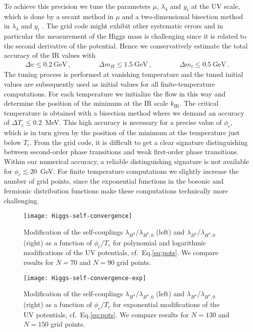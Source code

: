\documentclass[aps,prd,11pt,tightenlines,superscriptaddress,nofootinbib,preprintnumbers,notitlepage]{revtex4-1}
\newcommand{\qqquad}{\qquad \qquad}
\newcommand{\gev}{\text{GeV}}
\begin{document}
To achieve this precision we tune the parameters $\mu$,
$\lambda_4$ and $y_t$ at the UV scale, which is done by a secant
method in $\mu$ and a two-dimensional bisection method in $\lambda_4$
and $y_t$ .  The grid code might exhibit other systematic errors and
in particular the measurement of the Higgs mass is challenging since
it is related to the second derivative of the potential.  Hence we
conservatively estimate the total accuracy of the IR values with
%
\begin{align}
 \Delta v \leq 0.2 \ \gev\,, \qqquad \Delta m_H \leq 1.5 \ \gev\,,  \qqquad \Delta m_t \leq 0.5 \ \gev \,.
\end{align}
%
The tuning process is performed at vanishing temperature and the
tuned initial values are subsequently used as initial values for
all finite-temperature computations.  For each temperature we
initialize the flow in this way and determine the position of the
minimum at the IR scale $k_\text{IR}$.  The critical temperature is
obtained with a bisection method where we demand an accuracy of
$\Delta T_c \leq 0.2$~MeV.  This high accuracy is necessary for a
precise value of $\phi_c$, which is in turn given by the position of
the minimum at the temperature just below $T_c$.  From the grid code, it
is difficult to get a clear signature
distinguishing between second-order phase transitions and weak
first-order phase transitions.  
Within our numerical accuracy, a reliable distinguishing signature is not available
for
$\phi_c\lesssim20$~GeV.  For finite temperature computations we 
slightly increase the number of grid points, since the exponential
functions in the bosonic and fermionic distribution functions make
these computations technically more challenging.\bigskip


\begin{figure}[t]
 \texttt{[image: Higgs-self-convergence]}
 \caption{Modification of the self-couplings
   $\lambda_{H^3}/\lambda_{H^3,0}$ (left) and
   $\lambda_{H^4}/\lambda_{H^4,0}$ (right) as a function of
   $\phi_c/T_c$ for polynomial and logarithmic modifications of the UV
   potentials, cf.~Eq.\eqref{eq:pots}.  We compare results for $N=70$
   and $N=90$ grid points.}
 \label{fig:convergence}
\end{figure}

\begin{figure}[b!]
 \texttt{[image: Higgs-self-convergence-exp]}
 \caption{Modification of the self-couplings
   $\lambda_{H^3}/\lambda_{H^3,0}$ (left) and
   $\lambda_{H^4}/\lambda_{H^4,0}$ (right) as a function of
   $\phi_c/T_c$ for exponential modifications of the UV potentials,
   cf.~Eq.\eqref{eq:pots}.  We compare results for $N=130$ and
   $N=150$ grid points.}
 \label{fig:convergence-exp}
\end{figure}
\end{document}
